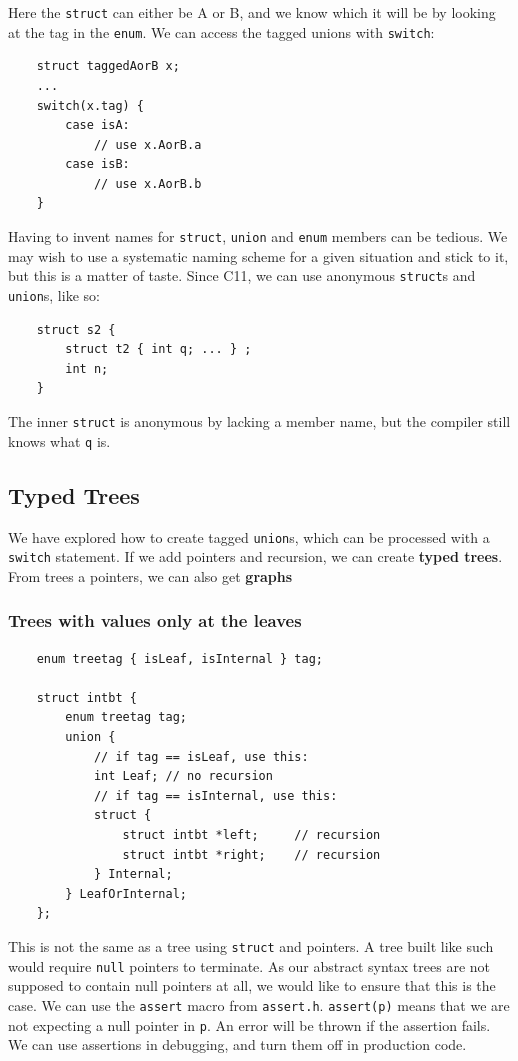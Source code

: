 \documentclass{article}
\begin{document}
	Here the \texttt{struct} can either be A or B, and we know which it will be by looking at the tag in the \texttt{enum}. We can access the tagged unions with \texttt{switch}:
	
	\begin{verbatim}
	struct taggedAorB x;
	...
	switch(x.tag) {
	    case isA:
	        // use x.AorB.a
	    case isB:
	        // use x.AorB.b
	}
	\end{verbatim}
	
	\par Having to invent names for \texttt{struct}, \texttt{union} and \texttt{enum} members can be tedious. We may wish to use a systematic naming scheme for a given situation and stick to it, but this is a matter of taste. Since C11, we can use anonymous \texttt{struct}s and \texttt{union}s, like so:
	
	\begin{verbatim}
	struct s2 {
	    struct t2 { int q; ... } ;
	    int n;
	}
	\end{verbatim}

	The inner \texttt{struct} is anonymous by lacking a member name, but the compiler still knows what \texttt{q} is.

	
	\subsection{Typed Trees}
	We have explored how to create tagged \texttt{union}s, which can be processed with a \texttt{switch} statement. If we add pointers and recursion, we can create \textbf{typed trees}. From trees a pointers, we can also get \textbf{graphs}
	
	\subsubsection{Trees with values only at the leaves}
	\begin{verbatim}
	enum treetag { isLeaf, isInternal } tag;
	
	struct intbt {
	    enum treetag tag;
	    union {
	        // if tag == isLeaf, use this:
	        int Leaf; // no recursion
	        // if tag == isInternal, use this:
	        struct {
	            struct intbt *left;     // recursion
	            struct intbt *right;    // recursion
	        } Internal;
	    } LeafOrInternal;
	};
	\end{verbatim}	
		
	This is not the same as a tree using \texttt{struct} and pointers. A tree built like such would require \texttt{null} pointers to terminate. As our abstract syntax trees are not supposed to contain null pointers at all, we would like to ensure that this is the case. We can use the \texttt{assert} macro from \texttt{assert.h}. \texttt{assert(p)} means that we are not expecting a null pointer in \texttt{p}. An error will be thrown if the assertion fails. We can use assertions in debugging, and turn them off in production code. 
	
\end{document}
